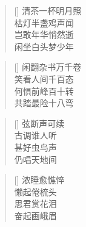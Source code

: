 \renewcommand{\poemtoc}{section}
\settowidth{\versewidth}{四年偏安南隅中}
\begin{verse}[\versewidth]
清茶一杯明月照\\
枯灯半盏鸡声闻\\
岂敢年华悄然逝\\
闲坐白头梦少年\\
\end{verse}

\renewcommand{\poemtoc}{section}
\settowidth{\versewidth}{四年偏安南隅中}
\begin{verse}[\versewidth]
闲翻杂书万千卷\\
笑看人间千百态\\
何惧前峰百十转\\
共踏最险十八弯\\
\end{verse}


\renewcommand{\poemtoc}{section}
\settowidth{\versewidth}{弦断声可续}
\begin{verse}[\versewidth]
弦断声可续\\
古调谁人听\\
甚好虫鸟声\\
仍唱天地间
\end{verse}

\renewcommand{\poemtoc}{section}
\settowidth{\versewidth}{浓睡愈憔悴}
\begin{verse}[\versewidth]
浓睡愈憔悴\\
懒起倦梳头\\
思君赏花泪\\
奋起画峨眉
\end{verse}
